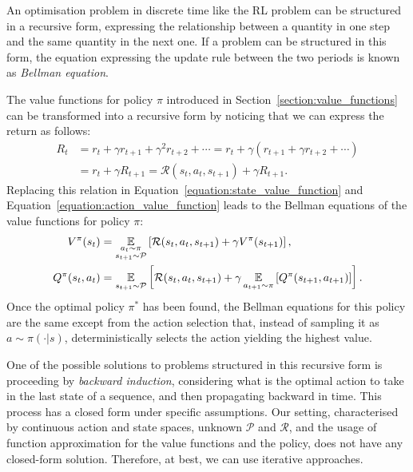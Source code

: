 An optimisation problem in discrete time like the \ac{RL} problem can be structured in a recursive form, \ie expressing the relationship between a quantity in one step and the same quantity in the next one.
If a problem can be structured in this form, the equation expressing the update rule between the two periods is known as \emph{Bellman equation}.

The value functions for policy $\pi$ introduced in Section~\ref{section:value_functions} can be transformed into a recursive form by noticing that we can express the return as follows:
%
\begin{align*}
    R_t
    &= r_t + \gamma r_{t+1} + \gamma^2 r_{t+2} + \cdots = r_t + \gamma \left( r_{t+1} + \gamma r_{t+2} + \cdots \right) \\
    &= r_t + \gamma R_{t+1} = \mathcal{R}(s_t, a_t, s_{t+1}) + \gamma R_{t+1}.
\end{align*}
%
Replacing this relation in Equation~\eqref{equation:state_value_function} and Equation~\eqref{equation:action_value_function} leads to the Bellman equations of the value functions for policy $\pi$:
%
\begin{align*}
    V^\pi(s_t) 
    &= \operatorname*{\mathbb{E}}_{\substack{a_t \sim \pi \\ s_{t+1} \sim \mathcal{P}}} \left[ \mathcal{R}(s_t, a_t, s_{t+1}) + \gamma V^\pi(s_{t+1}) \right] ,\\
    Q^\pi(s_t, a_t) 
    &= \operatorname*{\mathbb{E}}_{s_{t+1} \sim \mathcal{P}} \left[ \mathcal{R}(s_t, a_t, s_{t+1}) + \gamma \operatorname*{\mathbb{E}}_{a_{t+1} \sim \pi} \left[  Q^\pi(s_{t+1}, a_{t+1}) \right] \right] .
\end{align*}
%
Once the optimal policy $\pi^*$ has been found, the Bellman equations for this policy are the same except from the action selection that, instead of sampling it as $a \sim \pi(\cdot|s)$, deterministically selects the action yielding the highest value.

One of the possible solutions to problems structured in this recursive form is proceeding by \emph{backward induction}, \ie considering what is the optimal action to take in the last state of a sequence, and then propagating backward in time.
This process has a closed form under specific assumptions.
Our setting, characterised by continuous action and state spaces, unknown $\mathcal{P}$ and $\mathcal{R}$, and the usage of function approximation for the value functions and the policy, does not have any closed-form solution.
Therefore, at best, we can use iterative approaches.

